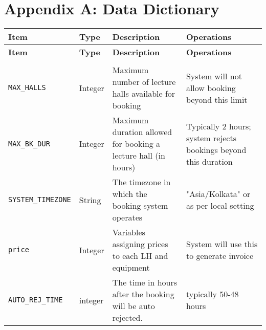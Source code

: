 \documentclass[a4paper,12pt]{article}
\begin{document}
\newpage

\appendix
\renewcommand{\appendixname}{Appendix}
\renewcommand{\thesection}{}
\section{Appendix A: Data Dictionary}
\hspace{-1cm}
\begin{longtable}{|>{\RaggedRight\arraybackslash}p{3.3cm}|p{2cm}|>{\RaggedRight\arraybackslash}p{5.5cm}|p{4cm}|}
    \hline
    \textbf{Item} & \textbf{Type} & \textbf{Description} & \textbf{Operations} \\
    \hline
    \endfirsthead
    \hline
    \textbf{Item} & \textbf{Type} & \textbf{Description} & \textbf{Operations} \\
    \hline
    \endhead
    \hline
    \endfoot

    \multicolumn{4}{|c|}{\textbf{Constants}} \\
    \hline
    \texttt{MAX\_HALLS} & Integer & Maximum number of lecture halls available for booking &System will not allow booking beyond this limit \\
    \hline
    \texttt{MAX\_BK\_DUR} & Integer & Maximum duration allowed for booking a lecture hall (in hours) & Typically 2 hours; system rejects bookings beyond this duration \\
    \hline
    \texttt{SYSTEM\_TIMEZONE} & String & The timezone in which the booking system operates & "Asia/Kolkata" or as per local setting \\
    \hline
    \texttt{price} & Integer & Variables assigning prices to each LH and equipment&System will use this to generate invoice \\
    \hline
    

        \hline
   \texttt{AUTO\_REJ\_TIME} & integer & The time in hours after the booking will be auto rejected. & typically 50-48 hours \\
    \hline



\end{longtable}
\end{document}
